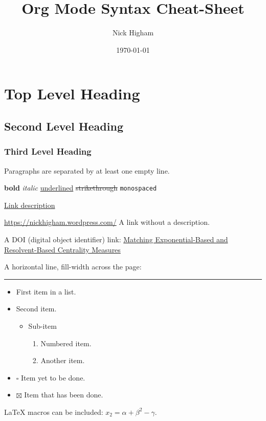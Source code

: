 \documentclass[11pt]{article}
\author{Nick Higham}
\date{\today}
\title{Org Mode Syntax Cheat-Sheet}
\begin{document}
\maketitle

\section{Top Level Heading}
\label{sec:orgc498267}
\subsection{Second Level Heading}
\label{sec:orga99f9b1}
\subsubsection{Third Level Heading}
\label{sec:org508ff51}

Paragraphs are separated by at least one empty line.

\textbf{bold} \emph{italic} \uline{underlined} \sout{strikethrough} \texttt{monospaced}

\href{https://nickhigham.wordpress.com/}{Link description}

\url{https://nickhigham.wordpress.com/} A link without a description.

A DOI (digital object identifier) link: 
\href{https://doi.org/10.1093/comnet/cnv016}{Matching Exponential-Based and Resolvent-Based Centrality Measures}

A horizontal line, fill-width across the page:

\rule{\linewidth}{0.5pt}

\begin{itemize}
\item First item in a list.
\item Second item.
\begin{itemize}
\item Sub-item
\begin{enumerate}
\item Numbered item.
\item Another item.
\end{enumerate}
\end{itemize}
\item $\square$ Item yet to be done.
\item $\boxtimes$ Item that has been done.
\end{itemize}

\LaTeX{} macros can be included: \(x_2 = \alpha + \beta^2 - \gamma\).
\end{document}
